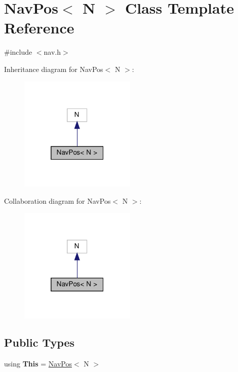 \hypertarget{classNavPos}{}\section{Nav\+Pos$<$ N $>$ Class Template Reference}
\label{classNavPos}


{\ttfamily \#include $<$nav.\+h$>$}



Inheritance diagram for Nav\+Pos$<$ N $>$\+:\nopagebreak
\begin{figure}[H]
\begin{center}
\leavevmode
\includegraphics[width=157pt]{classNavPos__inherit__graph}
\end{center}
\end{figure}


Collaboration diagram for Nav\+Pos$<$ N $>$\+:\nopagebreak
\begin{figure}[H]
\begin{center}
\leavevmode
\includegraphics[width=157pt]{classNavPos__coll__graph}
\end{center}
\end{figure}
\subsection*{Public Types}
\begin{DoxyCompactItemize}
\item 
\mbox{\label{classNavPos_aa32cd41af34948622157f83ab83d5c4a}} 
using {\bfseries This} = \hyperlink{classNavPos}{Nav\+Pos}$<$ N $>$
\end{DoxyCompactItemize}
